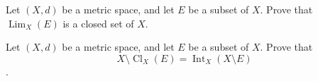 \documentclass[12pt,letterpaper,boxed]{hmcpset}
\DeclareMathOperator{\Lim}{Lim}
\DeclareMathOperator{\Int}{Int}
\DeclareMathOperator{\Cl}{Cl}
\begin{document}
\begin{problem}[Exercise 1.21]
Let $(X,d)$ be a metric space, and let $E$ be a subset of $X$. Prove that $\Lim_X(E)$ is a closed set of $X$.
\end{problem}

\begin{solution}

\end{solution}

\begin{problem}[Exercise 1.24]
Let $(X,d)$ be a metric space, and let $E$ be a subset of $X$. Prove that $$X\setminus\Cl_X(E)=\Int_X(X\setminus E)$$. 
\end{problem}

\begin{solution}

\end{solution}
\end{document}
